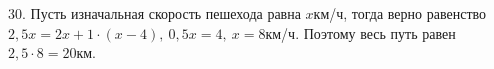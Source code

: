 30. Пусть изначальная скорость пешехода равна $x$км/ч, тогда верно равенство $2,5x=2x+1\cdot(x-4),\ 0,5x=4,\ x=8$км/ч. Поэтому весь путь равен $2,5\cdot8=20$км.\\
